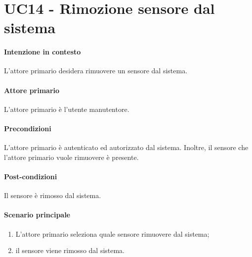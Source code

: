 \section{UC14 - Rimozione sensore dal sistema}\label{uc:14}


\paragraph{Intenzione in contesto}
L'attore primario desidera rimuovere un sensore dal sistema.
\paragraph{Attore primario}L'attore primario è l'utente manutentore.

\paragraph{Precondizioni} L'attore primario è autenticato ed autorizzato dal sistema. Inoltre, il sensore che l'attore primario vuole rimuovere è presente.

\paragraph{Post-condizioni} Il sensore è rimosso dal sistema.
\paragraph{Scenario principale}
\begin{enumerate}
    \item L'attore primario seleziona quale sensore rimuovere dal sistema;
    \item il sensore viene rimosso dal sistema.
\end{enumerate}